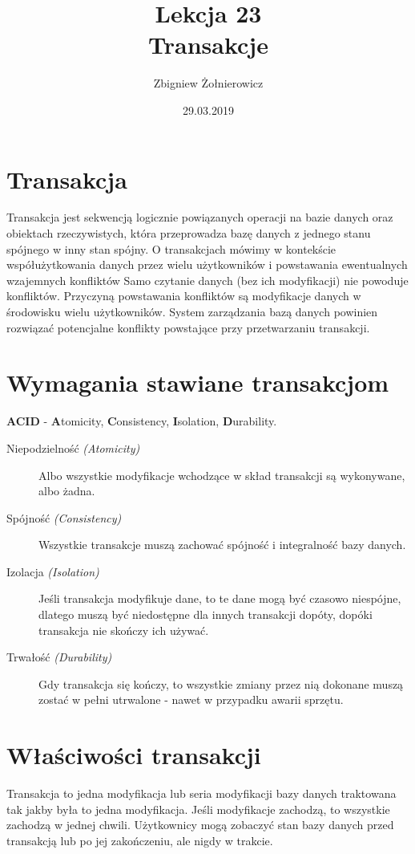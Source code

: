 \documentclass{article}
\begin{document}
\title{{\huge Lekcja 23} \\
{\large Transakcje}}
\author{Zbigniew Żołnierowicz}
\date{29.03.2019}
\maketitle
\section{Transakcja}
Transakcja jest sekwencją logicznie powiązanych operacji na bazie danych oraz obiektach rzeczywistych,
która przeprowadza bazę danych z jednego stanu spójnego w inny stan spójny.
O transakcjach mówimy w kontekście współużytkowania danych przez wielu użytkowników i powstawania ewentualnych wzajemnych konfliktów
Samo czytanie danych (bez ich modyfikacji) nie powoduje konfliktów.
Przyczyną powstawania konfliktów są modyfikacje danych w środowisku wielu użytkowników.
System zarządzania bazą danych powinien rozwiązać potencjalne konflikty powstające przy przetwarzaniu transakcji.
\section{Wymagania stawiane transakcjom}
\Large{\textbf{ACID} - \textbf{A}tomicity, \textbf{C}onsistency, \textbf{I}solation, \textbf{D}urability.}
\normalsize
\begin{description}
    \item[Niepodzielność {\em (Atomicity)}] Albo wszystkie modyfikacje wchodzące w skład transakcji są wykonywane, albo żadna.
    \item[Spójność {\em (Consistency)}] Wszystkie transakcje muszą zachować spójność i integralność bazy danych.
    \item[Izolacja {\em (Isolation)}] Jeśli transakcja modyfikuje dane, to te dane mogą być czasowo niespójne, dlatego muszą być niedostępne dla innych transakcji dopóty, dopóki transakcja nie skończy ich używać.
    \item[Trwałość {\em (Durability)}] Gdy transakcja się kończy, to wszystkie zmiany przez nią dokonane muszą zostać w pełni utrwalone - nawet w przypadku awarii sprzętu.
\end{description}
\pagebreak
\section{Właściwości transakcji}
Transakcja to jedna modyfikacja lub seria modyfikacji bazy danych traktowana tak jakby była to jedna modyfikacja.
Jeśli modyfikacje zachodzą, to wszystkie zachodzą w jednej chwili.
Użytkownicy mogą zobaczyć stan bazy danych przed transakcją lub po jej zakończeniu, ale nigdy w trakcie.
\end{document}
